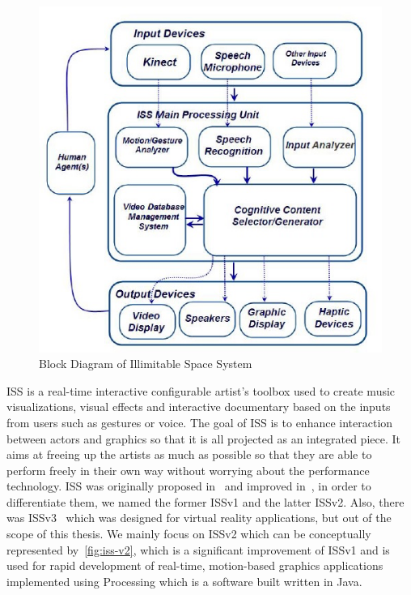 \begin{figure}
    \begin{center}
        \includegraphics[scale=0.6]{figures/iss_v2_model.png}
    \end{center}
    \caption{Block Diagram of Illimitable Space System}
    \label{fig:iss-v2}
\end{figure}

ISS is a real-time interactive configurable
artist's toolbox used to create music visualizations, visual effects and
interactive documentary based on the inputs from users such as gestures or
voice.
The goal of ISS is to enhance interaction between actors and graphics so that
it is all projected as an integrated piece. It aims at freeing up the artists
as much as possible so that they are able to perform freely in their own way
without worrying about the performance technology.
ISS was originally proposed in~\cite{first-proposed-iss} and improved 
in~\cite{iss-v2-design-theory-journal}, in order to differentiate them, we named
the former ISSv1 and the latter ISSv2. Also, there was 
ISSv3~\cite{iss-v3-appy-hour-gem2015, iss-v3-appy-hour-siggraph2015} which
was designed for virtual reality applications, but out of the scope of this 
thesis. 
We mainly focus on ISSv2 which can be conceptually represented 
by~\autoref{fig:iss-v2}, which is a significant improvement of ISSv1 and is used
for rapid development of real-time, motion-based graphics applications
implemented using Processing which is a software built written in Java.

